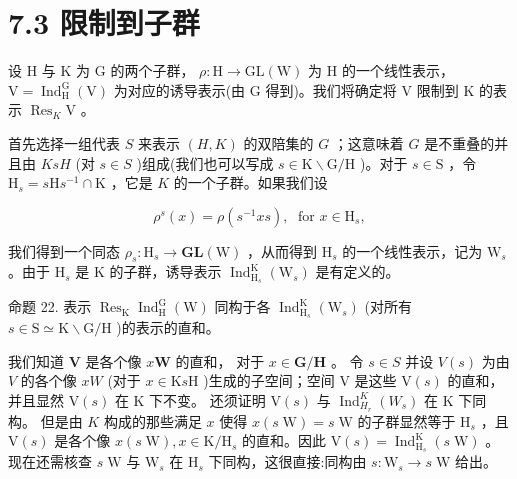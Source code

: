 \documentclass[10pt]{article}
\begin{document}
\section*{7.3 限制到子群}

设 \(\mathrm{H}\) 与 \(\mathrm{K}\) 为 \(\mathrm{G}\) 的两个子群， \(\rho  : \mathrm{H} \rightarrow  \mathrm{{GL}}\left( \mathrm{W}\right)\) 为 \(\mathrm{H}\) 的一个线性表示， \(\mathrm{V} = {\operatorname{Ind}}_{\mathrm{H}}^{\mathrm{G}}\left( \mathrm{V}\right)\) 为对应的诱导表示(由 \(\mathrm{G}\) 得到)。我们将确定将 \(\mathrm{V}\) 限制到 \(\mathrm{K}\) 的表示 \({\operatorname{Res}}_{K}\mathrm{V}\) 。

首先选择一组代表 \(S\) 来表示 \(\left( {H,K}\right)\) 的双陪集的 \(G\) ；这意味着 \(G\) 是不重叠的并且由 \({KsH}\) (对 \(s \in  S\) )组成(我们也可以写成 \(s \in  \mathrm{K} \smallsetminus  \mathrm{G}/\mathrm{H}\) )。对于 \(s \in  \mathrm{S}\) ，令 \({\mathrm{H}}_{s} = s\mathrm{H}{s}^{-1} \cap  \mathrm{K}\) ，它是 \(K\) 的一个子群。如果我们设

\[
{\rho }^{s}\left( x\right)  = \rho \left( {{s}^{-1}{xs}}\right) ,\;\text{ for }x \in  {\mathrm{H}}_{s},
\]

我们得到一个同态 \({\rho }_{s} : {\mathrm{H}}_{s} \rightarrow  \mathbf{{GL}}\left( \mathrm{W}\right)\) ，从而得到 \({\mathrm{H}}_{s}\) 的一个线性表示，记为 \({\mathrm{W}}_{s}\) 。由于 \({\mathrm{H}}_{s}\) 是 \(\mathrm{K}\) 的子群，诱导表示 \({\operatorname{Ind}}_{{\mathrm{H}}_{s}}^{\mathrm{K}}\left( {\mathrm{W}}_{s}\right)\) 是有定义的。

命题 22. 表示 \({\operatorname{Res}}_{\mathrm{K}}{\operatorname{Ind}}_{\mathrm{H}}^{\mathrm{G}}\left( \mathrm{W}\right)\) 同构于各 \({\operatorname{Ind}}_{{\mathrm{H}}_{s}}^{\mathrm{K}}\left( {\mathrm{W}}_{s}\right)\) (对所有 \(s \in  \mathrm{S} \simeq  \mathrm{K} \smallsetminus  \mathrm{G}/\mathrm{H}\) )的表示的直和。

我们知道 \(\mathbf{V}\) 是各个像 \(x\mathbf{W}\) 的直和， 对于 \(x \in  \mathbf{G}/\mathbf{H}\) 。 令 \(s \in  S\) 并设 \(V\left( s\right)\) 为由 \(V\) 的各个像 \({xW}\) (对于 \(x \in  \mathrm{K}s\mathrm{H}\) )生成的子空间；空间 \(\mathrm{V}\) 是这些 \(\mathrm{V}\left( s\right)\) 的直和，并且显然 \(\mathrm{V}\left( s\right)\) 在 \(\mathrm{K}\) 下不变。 还须证明 \(\mathrm{V}\left( s\right)\) 与 \({\operatorname{Ind}}_{{H}_{r}}^{K}\left( {W}_{s}\right)\) 在 \(\mathrm{K}\) 下同构。 但是由 \(K\) 构成的那些满足 \(x\) 使得 \(x\left( {s\mathrm{\;W}}\right)  = s\mathrm{\;W}\) 的子群显然等于 \({\mathrm{H}}_{s}\) ，且 \(\mathrm{V}\left( s\right)\) 是各个像 \(x\left( {s\mathrm{\;W}}\right) ,x \in  \mathrm{K}/{\mathrm{H}}_{s}\) 的直和。因此 \(\mathrm{V}\left( s\right)  = {\operatorname{Ind}}_{{\mathrm{H}}_{s}}^{\mathrm{K}}\left( {s\mathrm{\;W}}\right)\) 。 现在还需核查 \(s\mathrm{\;W}\) 与 \({\mathrm{W}}_{s}\) 在 \({\mathrm{H}}_{s}\) 下同构，这很直接:同构由 \(s : {\mathrm{W}}_{s} \rightarrow  s\mathrm{\;W}\) 给出。
\end{document}
